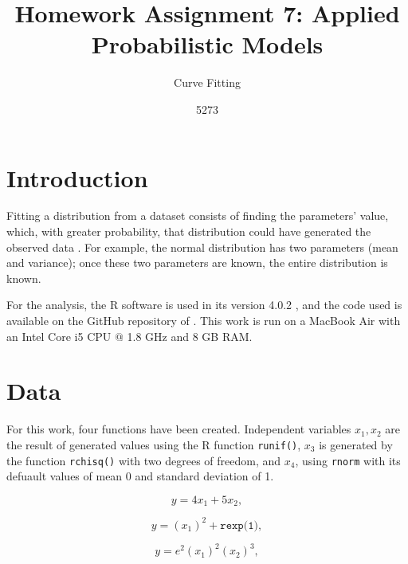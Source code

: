 \documentclass[10pt,leter,openany]{article}
\author{5273}
\title{Homework Assignment 7: Applied Probabilistic Models}
\subtitle{Curve Fitting}
\date{}
\begin{document}
	
\maketitle

\section{Introduction}
	
	Fitting a distribution from a dataset consists of finding the parameters' value, which, with greater probability, that distribution could have generated the observed data \citep{joaquin2020}. For example, the normal distribution has two parameters (mean and variance); once these two parameters are known, the entire distribution is known.
	
	For the analysis, the R software is used in its version 4.0.2 \citep{r}, and the code used is available on the GitHub repository of  \citep{github}. This work is run on a MacBook Air with an Intel Core i5 CPU $ @ $ 1.8 GHz and 8 GB RAM.
	
	
	\section{Data}
	
	For this work, four functions have been created. Independent variables $x_{1}, x_{2}$ are the result of generated values using the R function \texttt{runif()}, $x_{3}$ is generated by the function \texttt{rchisq()} with two degrees of freedom, and $ x_{4} $, using \texttt{rnorm} with its defuault values of mean 0 and standard deviation of 1.
	
		\begin{equation} \label{eq:1}
				y =4x_{1} + 5x_{2},
		\end{equation}  
		
		\begin{equation} \label{eq:2}
				 y = (x_{1})^{2} + \texttt{rexp(1)},
			\end{equation}  
		
		
		\begin{equation} \label{eq:4}
				y = e^{2}(x_{1})^{2}(x_{2}) ^{3} ,
			\end{equation}  
		
\end{document}
